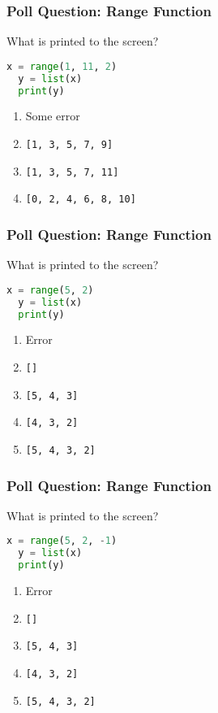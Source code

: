 \documentclass{beamer}
\begin{document}
%
%
\begin{frame}[fragile]
  \frametitle{Poll Question: Range Function}
  What is printed to the screen?
  \begin{lstlisting}[language=Python, autogobble]
  x = range(1, 11, 2)
  y = list(x)
  print(y)
  \end{lstlisting}
  \vfill
  \begin{enumerate}[A]
    \item Some error
    \item \lstinline|[1, 3, 5, 7, 9]|
    \item \lstinline|[1, 3, 5, 7, 11]|
    \item \lstinline|[0, 2, 4, 6, 8, 10]|
  \end{enumerate}
\end{frame}

%
%
\begin{frame}[fragile]
  \frametitle{Poll Question: Range Function}
  What is printed to the screen?
  \begin{lstlisting}[language=Python, autogobble]
  x = range(5, 2)
  y = list(x)
  print(y)
  \end{lstlisting}
  \vfill
  \begin{enumerate}[A]
    \item Error
    \item \lstinline|[]|
    \item \lstinline|[5, 4, 3]|
    \item \lstinline|[4, 3, 2]|
    \item \lstinline|[5, 4, 3, 2]|
  \end{enumerate}
\end{frame}

%
%
\begin{frame}[fragile]
  \frametitle{Poll Question: Range Function}
  What is printed to the screen?
  \begin{lstlisting}[language=Python, autogobble]
  x = range(5, 2, -1)
  y = list(x)
  print(y)
  \end{lstlisting}
  \vfill
  \begin{enumerate}[A]
    \item Error
    \item \lstinline|[]|
    \item \lstinline|[5, 4, 3]|
    \item \lstinline|[4, 3, 2]|
    \item \lstinline|[5, 4, 3, 2]|
  \end{enumerate}
\end{frame}
\end{document}
